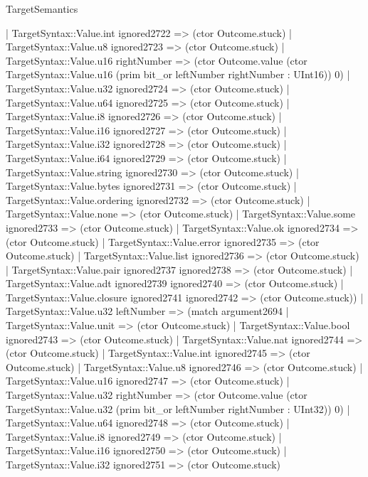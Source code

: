 \begin{lexlean}{TargetSemantics}
\begin{semanticmodule}
{              | TargetSyntax::Value.int ignored2722 => (ctor Outcome.stuck)
              | TargetSyntax::Value.u8 ignored2723 => (ctor Outcome.stuck)
              | TargetSyntax::Value.u16 rightNumber => (ctor Outcome.value (ctor TargetSyntax::Value.u16 (prim bit_or leftNumber rightNumber : UInt16)) 0)
              | TargetSyntax::Value.u32 ignored2724 => (ctor Outcome.stuck)
              | TargetSyntax::Value.u64 ignored2725 => (ctor Outcome.stuck)
              | TargetSyntax::Value.i8 ignored2726 => (ctor Outcome.stuck)
              | TargetSyntax::Value.i16 ignored2727 => (ctor Outcome.stuck)
              | TargetSyntax::Value.i32 ignored2728 => (ctor Outcome.stuck)
              | TargetSyntax::Value.i64 ignored2729 => (ctor Outcome.stuck)
              | TargetSyntax::Value.string ignored2730 => (ctor Outcome.stuck)
              | TargetSyntax::Value.bytes ignored2731 => (ctor Outcome.stuck)
              | TargetSyntax::Value.ordering ignored2732 => (ctor Outcome.stuck)
              | TargetSyntax::Value.none => (ctor Outcome.stuck)
              | TargetSyntax::Value.some ignored2733 => (ctor Outcome.stuck)
              | TargetSyntax::Value.ok ignored2734 => (ctor Outcome.stuck)
              | TargetSyntax::Value.error ignored2735 => (ctor Outcome.stuck)
              | TargetSyntax::Value.list ignored2736 => (ctor Outcome.stuck)
              | TargetSyntax::Value.pair ignored2737 ignored2738 => (ctor Outcome.stuck)
              | TargetSyntax::Value.adt ignored2739 ignored2740 => (ctor Outcome.stuck)
              | TargetSyntax::Value.closure ignored2741 ignored2742 => (ctor Outcome.stuck))
            | TargetSyntax::Value.u32 leftNumber => (match argument2694
              | TargetSyntax::Value.unit => (ctor Outcome.stuck)
              | TargetSyntax::Value.bool ignored2743 => (ctor Outcome.stuck)
              | TargetSyntax::Value.nat ignored2744 => (ctor Outcome.stuck)
              | TargetSyntax::Value.int ignored2745 => (ctor Outcome.stuck)
              | TargetSyntax::Value.u8 ignored2746 => (ctor Outcome.stuck)
              | TargetSyntax::Value.u16 ignored2747 => (ctor Outcome.stuck)
              | TargetSyntax::Value.u32 rightNumber => (ctor Outcome.value (ctor TargetSyntax::Value.u32 (prim bit_or leftNumber rightNumber : UInt32)) 0)
              | TargetSyntax::Value.u64 ignored2748 => (ctor Outcome.stuck)
              | TargetSyntax::Value.i8 ignored2749 => (ctor Outcome.stuck)
              | TargetSyntax::Value.i16 ignored2750 => (ctor Outcome.stuck)
              | TargetSyntax::Value.i32 ignored2751 => (ctor Outcome.stuck)
}
\end{semanticmodule}
\end{lexlean}
